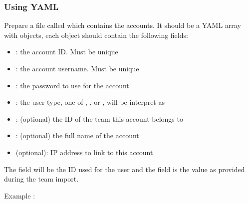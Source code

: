 \documentclass[a4paper,10pt,english,openany]{sphinxmanual}
\begin{document}
\subsubsection{Using YAML}
\label{\detokenize{import:using-yaml}}
\sphinxAtStartPar
Prepare a file called  which contains the accounts.
It should be a YAML array with objects, each object should contain the following
fields:
\begin{itemize}
\item {} 
\sphinxAtStartPar
{}: the account ID. Must be unique

\item {} 
\sphinxAtStartPar
{}: the account username. Must be unique

\item {} 
\sphinxAtStartPar
{}: the password to use for the account

\item {} 
\sphinxAtStartPar
{}: the user type, one of , ,  or ,  will be interpret as 

\item {} 
\sphinxAtStartPar
{}: (optional) the ID of the team this account belongs to

\item {} 
\sphinxAtStartPar
{}: (optional) the full name of the account

\item {} 
\sphinxAtStartPar
{} (optional): IP address to link to this account

\end{itemize}

\sphinxAtStartPar
The  field will be the ID used for the user and the  field is the value as provided during
the team import.

\sphinxAtStartPar
Example :
\end{document}
